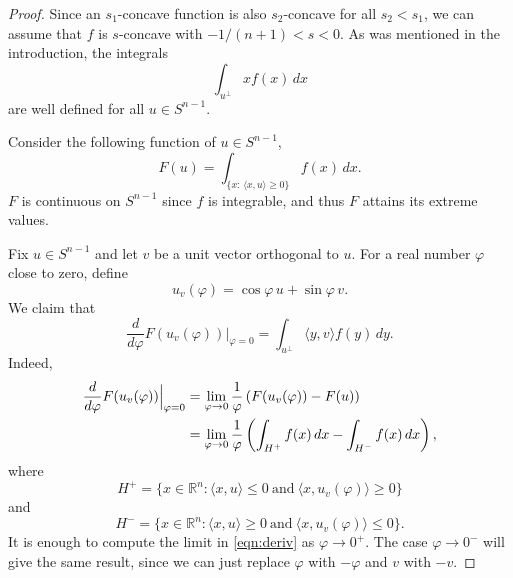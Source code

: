 \documentclass[10pt,a4paper]{amsart}
\begin{document}
			\begin{proof} Since an $s_1$-concave function is also $s_2$-concave for all $s_2<s_1$, we can assume that $f$ is   $s$-concave with $-1/(n+1)<s<0$.
				As was mentioned in the introduction, the integrals $$
				\int_{u^\perp} x f(x) \, dx 
				$$
				are well defined for all $u\in S^{n-1}$.
				
				Consider the following function of $u \in S^{n-1}$,
				$$
				F(u) = \int_{\{x: \, \langle x, u\rangle \geq 0\} } f(x) \, dx.
				$$
				$F$ is continuous on $S^{n-1}$ since $f$ is integrable, and thus $F$ attains its extreme values. 
				
			Fix $u\in S^{n-1}$ and  let $v$ be a unit vector orthogonal to $u$. For a real number  $\varphi$ close to zero, define $$u_v(\varphi) = \cos\varphi\, u +\sin \varphi\, v.$$ We claim that 
				\begin{equation}\label{formula:der}
					\frac{d}{d\varphi} F(u_v(\varphi)) \Big|_{\varphi=0} =  \int_{u^\perp} \langle y,v\rangle f(y) \, dy.
					\end{equation}
				Indeed,
				\begin{align}\label{eqn:deriv}\frac{d}{d\varphi} F(u_v(\varphi)) \Big|_{\varphi=0} &=\lim_{\varphi\to 0} \frac1{\varphi} \left(F(u_v(\varphi))- F(u)\right)		\notag	\\
					&=\lim_{\varphi\to 0} \frac1{\varphi} \left( \int_{H^+} f(x) \, dx - \int_{H^-} f(x) \, dx\right)	,		
					\end{align}
						where $$H^+ = \{ x\in \mathbb R^n: \langle  x , u\rangle \leq 0 \ \text{and}\ \langle  x , u_v(\varphi)\rangle \geq 0 \}$$ and $$H^- = \{ x\in \mathbb R^n: \langle  x , u\rangle \geq 0 \ \text{and}\ \langle  x , u_v(\varphi)\rangle \leq 0 \}.$$
						It is enough to compute the limit in \eqref{eqn:deriv} as $\varphi\to 0^+$.  The case $\varphi\to 0^-$ will give the same result, since we can just replace $\varphi$ with $-\varphi$ and $v$ with $-v$.
						
						
						

\end{proof}
\end{document}
